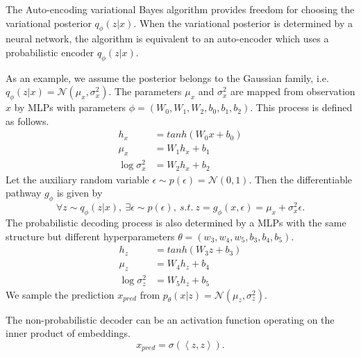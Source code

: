 The Auto-encoding variational Bayes algorithm provides freedom for choosing the variational posterior $q_{\phi}(z|x)$. 
When the variational posterior is determined by a neural network, 
the algorithm is equivalent to an auto-encoder which uses a probabilistic encoder $q_{\phi}(z|x)$. 

As an example, we assume the posterior belongs to the Gaussian family, i.e. $q_{\phi}(z|x)=\mathcal{N}(\mu_x,\sigma_x^2)$. 
The parameters $\mu_x$ and $\sigma_x^2$ are mapped from observation $x$ by MLPs with parameters $\phi=(W_0,W_1,W_2,b_0,b_1,b_2)$. 
This process is defined as follows. 
\begin{align*}
    h_x &= tanh(W_0x+b_0) \\
    \mu_x &= W_1h_x+b_1 \\
    \log\sigma_x^2 &= W_2h_x+b_2
\end{align*}
Let the auxiliary random variable $\epsilon\sim p(\epsilon)=\mathcal{N}(0,1)$. 
Then the differentiable pathway $g_{\phi}$ is given by 
\begin{equation*}
    \forall z\sim q_{\phi}(z|x),\ \exists\epsilon\sim p(\epsilon),\ s.t.\ z=g_{\phi}(x,\epsilon)=\mu_x + \sigma_x^2\epsilon. 
\end{equation*}
The probabilistic decoding process is also determined by a MLPs with the same structure but different hyperparameters $\theta=(w_3,w_4,w_5,b_3,b_4,b_5)$. 
\begin{align*}
    h_z &= tanh(W_3z+b_3) \\
    \mu_z &= W_4h_z+b_4 \\
    \log\sigma_z^2 &= W_5h_z+b_5
\end{align*}
We sample the prediction $x_{pred}$ from $p_{\theta}(x|z)=\mathcal{N}(\mu_z,\sigma_z^2)$. 

The non-probabilistic decoder can be an activation function operating on the inner product of embeddings. 
\begin{equation*}
    x_{pred} = \sigma(\left\langle z, z\right\rangle).
\end{equation*}
